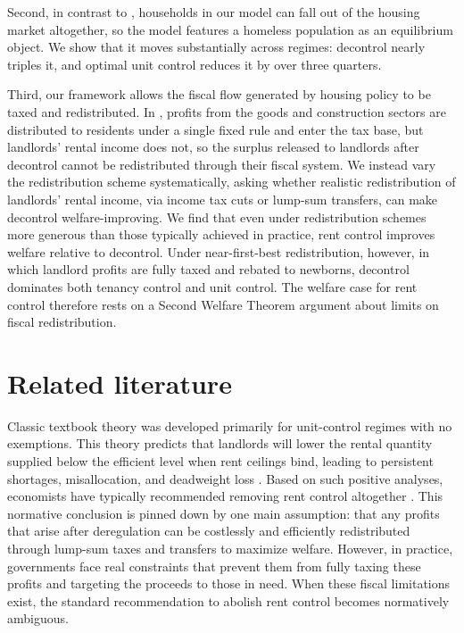 \documentclass[parskip=full]{article}
\begin{document}
Second, in contrast to \citet{fmn-2023}, households in our model can fall out of the housing market altogether, so the model features a homeless population as an equilibrium object. We show that it moves substantially across regimes: decontrol nearly triples it, and optimal unit control reduces it by over three quarters. 

Third, our framework allows the fiscal flow generated by housing policy to be taxed and redistributed. In \citet{fmn-2023}, profits from the goods and construction sectors are distributed to residents under a single fixed rule and enter the tax base, but landlords' rental income does not, so the surplus released to landlords after decontrol cannot be redistributed through their fiscal system. We instead vary the redistribution scheme systematically, asking whether realistic redistribution of landlords' rental income, via income tax cuts or lump-sum transfers, can make decontrol welfare-improving. We find that even under redistribution schemes more generous than those typically achieved in practice, rent control improves welfare relative to decontrol. Under near-first-best redistribution, however, in which landlord profits are fully taxed and rebated to newborns, decontrol dominates both tenancy control and unit control. The welfare case for rent control therefore rests on a Second Welfare Theorem argument about limits on fiscal redistribution.

\section{Related literature}\label{sec:related_lit}

Classic textbook theory was developed primarily for unit-control regimes with no exemptions. This theory predicts that landlords will lower the rental quantity supplied below the efficient level when rent ceilings bind, leading to persistent shortages, misallocation, and deadweight loss \citep{suen-1989,gl-2003,diamond-2019}. Based on such positive analyses, economists have typically recommended removing rent control altogether \citep{lindbeck1971,buchanan_1986,friedman_stigler_1946}. This normative conclusion is pinned down by one main assumption: that any profits that arise after deregulation can be costlessly and efficiently redistributed through lump-sum taxes and transfers to maximize welfare. However, in practice, governments face real constraints that prevent them from fully taxing these profits and targeting the proceeds to those in need. When these fiscal limitations exist, the standard recommendation to abolish rent control becomes normatively ambiguous.
\end{document}
